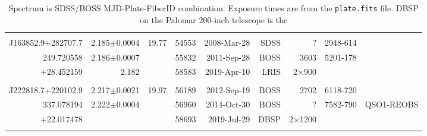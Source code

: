 \documentclass[a4paper,fleqn,usenatbib]{mnras}
\begin{document}
\begin{table*}
\begin{tabular}{r  r  r r r   r r r r}
                                     &                                        &                          &              &                          &                   &                                &                              & \\
 J163852.9+282707.7   & 2.185$\pm$0.0004       &   19.77               & 54553 & 2008-Mar-28     & SDSS             & ?                          &  2948-614              & \\
    249.720558	             &  2.186$\pm$0.0007      &                           & 55832  & 2011-Sep-28     & BOSS            &   3603                  &  5201-178            & \\
     +28.452159             &  2.182                           &                           & 58583 & 2019-Apr-10      & LRIS              &  2$\times$900    &                              & \\
                                      &                                      &                          &              &                           &                   &                              &                                & \\
 J222818.7+220102.9   & 2.217$\pm$0.0021      & 19.97                 & 56189 & 2012-Sep-19      & BOSS             &  2702                 &   6118-720          & \\
      337.078194             & 2.222$\pm$0.0004      &                          & 56960 & 2014-Oct-30      & BOSS             & ?                         &   7582-790          & QSO1-REOBS \\ 
      +22.017478            &                                      &                          & 58693 & 2019-Jul-29        & DBSP              & 2$\times$1200  &                           &    \\
                                      &                                     &                           &            &                             &                   &                              &                            & \\
   \hline \hline   
  \end{tabular}
  \caption{Spectrum is SDSS/BOSS MJD-Plate-FiberID combination. 
Exposure times are from the {\tt plate.fits} file. 
DBSP on the Palomar 200-inch telescope is the } 
 \label{tab:obs_notes}
\end{table*}
\end{document}
